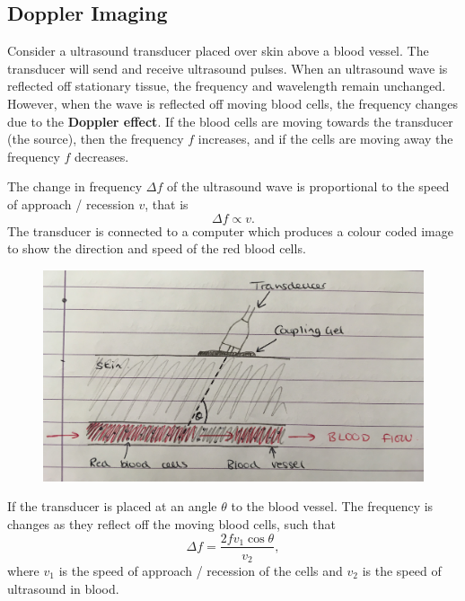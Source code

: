 \subsection{Doppler Imaging}

Consider a ultrasound transducer placed over skin above a blood vessel. The transducer will send and receive ultrasound pulses. When an ultrasound wave is reflected off stationary tissue, the frequency and wavelength remain unchanged. However, when the wave is reflected off moving blood cells, the frequency changes due to the \textbf{Doppler effect}. If the blood cells are moving towards the transducer (the source), then the frequency $f$ increases, and if the cells are moving away the frequency $f$ decreases.

The change in frequency $\Delta f$ of the ultrasound wave is proportional to the speed of approach / recession $v$, that is
\begin{equation}
    \Delta f \propto v.
\end{equation}
The transducer is connected to a computer which produces a colour coded image to show the direction and speed of the red blood cells.

\begin{figure}[h!]
    \centering
    \includegraphics[scale=0.1]{notes/images/Ultrasound-3.JPG}
\end{figure}
\FloatBarrier

If the transducer is placed at an angle $\theta$ to the blood vessel. The frequency is changes as they reflect off the moving blood cells, such that
\begin{equation}
    \Delta f = \frac{2 f v_1 \cos \theta}{v_2},
\end{equation}
where $v_1$ is the speed of approach / recession of the cells and $v_2$ is the speed of ultrasound in blood. 



